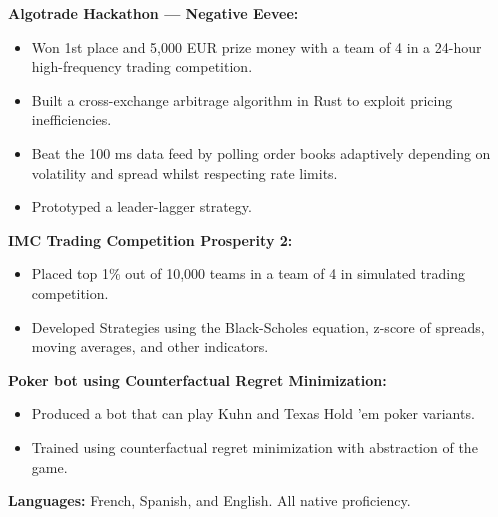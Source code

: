 \documentclass[a4paper,10pt]{article}
\begin{document}
\noindent
\textbf{Algotrade Hackathon — Negative Eevee:}
\begin{itemize}[noitemsep, topsep=0pt, parsep=0pt, partopsep=0pt]
    \item Won 1st place and 5,000 EUR prize money with a team of 4 in a 24-hour high-frequency trading competition.
    \item Built a cross-exchange arbitrage algorithm in Rust to exploit pricing inefficiencies.
    \item Beat the 100 ms data feed by polling order books adaptively depending on volatility and spread whilst respecting rate limits.
    \item Prototyped a leader-lagger strategy.
\end{itemize}

\medskip

\noindent
\textbf{IMC Trading Competition Prosperity 2:}
\begin{itemize}[noitemsep, topsep=0pt, parsep=0pt, partopsep=0pt]
    \item Placed top 1\% out of 10,000 teams in a team of 4 in simulated trading competition.
    \item Developed Strategies using the Black-Scholes equation, z-score of spreads, moving averages, and other indicators.
\end{itemize}

\medskip

\noindent
\textbf{Poker bot using Counterfactual Regret Minimization:}
\begin{itemize}[noitemsep, topsep=0pt, parsep=0pt, partopsep=0pt]
    \item Produced a bot that can play Kuhn and Texas Hold 'em poker variants.
    \item Trained using counterfactual regret minimization with abstraction of the game.
\end{itemize}

\vspace{1.5em}

\noindent
\textbf{Languages:} French, Spanish, and English. All native proficiency.
\end{document}
